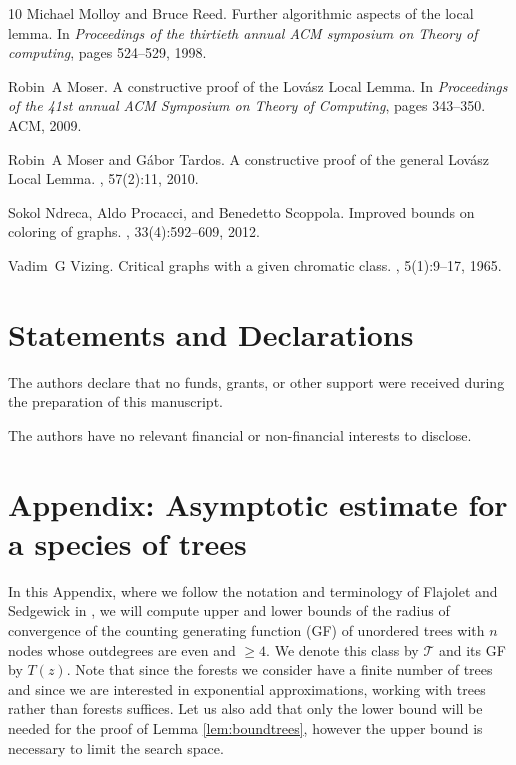 \documentclass{amsart}
\theoremstyle{plain}
\newcommand{\T}{\mathcal{T}}
\newcommand{\nicetrees}{T}
\begin{document}
\begin{thebibliography}{10}
Michael Molloy and Bruce Reed.
\newblock Further algorithmic aspects of the local lemma.
\newblock In {\em Proceedings of the thirtieth annual ACM symposium on Theory
  of computing}, pages 524--529, 1998.

Robin~A Moser.
\newblock A constructive proof of the {L}ov{\'a}sz {L}ocal {L}emma.
\newblock In {\em Proceedings of the 41st annual ACM Symposium on Theory of
  Computing}, pages 343--350. ACM, 2009.

Robin~A Moser and G{\'a}bor Tardos.
\newblock A constructive proof of the general {L}ov{\'a}sz {L}ocal {L}emma.
, 57(2):11, 2010.

Sokol Ndreca, Aldo Procacci, and Benedetto Scoppola.
\newblock Improved bounds on coloring of graphs.
, 33(4):592--609, 2012.

Vadim~G Vizing.
\newblock Critical graphs with a given chromatic class.
, 5(1):9--17, 1965.

\end{thebibliography}



\section*{Statements and Declarations}
 The authors declare that no funds, grants, or other support were received during the preparation of this manuscript.

 The authors have no relevant financial or non-financial interests to disclose.






\section*{Appendix: Asymptotic estimate for a species of trees}
%
In this Appendix, where we follow the notation and terminology of Flajolet and Sedgewick in \cite{Flajolet:2009:AC:1506267}, we will compute upper and lower bounds of the radius of convergence of the counting generating function (GF)  of unordered trees with $n$ nodes whose outdegrees are even and $\geq 4$. We denote this class by $\T$ and its GF by $\nicetrees(z)$.  Note that since the forests we consider have a finite number of trees and since we are interested in exponential approximations, working with trees rather than forests suffices. Let us also add that only the lower bound will be needed for the proof of  Lemma \ref{lem:boundtrees}, however the upper bound is necessary to limit the search space. 
\end{document}
